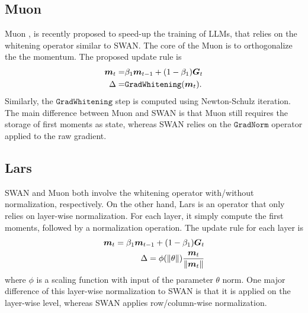 \subsection{Muon}
\label{subapp: Muon}
Muon \citep{jordan2024muon}, is recently proposed to speed-up the training of LLMs, that relies on the whitening operator similar to SWAN. The core of the Muon is to orthogonalize the the momentum. The proposed update rule is 
\begin{align}
    {\bm{m}}_t =& \beta_1 {\bm{m}}_{t-1}+(1-\beta_1){\bm{G}}_t\nonumber\\
    \Delta =& \mathtt{GradWhitening}({\bm{m}}_t).
    \label{eq: Muon update}
\end{align}
Similarly, the $\mathtt{GradWhitening}$ step is computed using Newton-Schulz iteration. The main difference between Muon and SWAN is that Muon still requires the storage of first moments as state, whereas SWAN relies on the $\mathtt{GradNorm}$ operator applied to the raw gradient.  

\subsection{Lars}
\label{subapp: Lars}
SWAN and Muon both involve the whitening operator with/without normalization, respectively. On the other hand, Lars \citep{you2017lars} is an operator that only relies on layer-wise normalization. For each layer, it simply compute the first moments, followed by a normalization operation. The update rule for each layer is 
\begin{align}
    {\bm{m}}_t = \beta_1{\bm{m}}_{t-1} + (1-\beta_1){\bm{G}}_t\nonumber\\
    \Delta = \phi(\Vert\theta\Vert)\frac{{\bm{m}}_t}{\Vert{\bm{m}}_t\Vert}
    \label{eq: Lars update}
\end{align}
where $\phi$ is a scaling function with input of the parameter $\theta$ norm. One major difference of this layer-wise normalization to SWAN is that it is applied on the layer-wise level, whereas SWAN applies row/column-wise normalization. 


